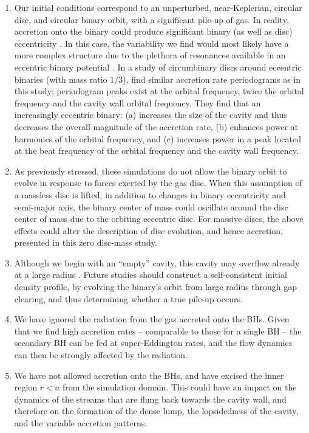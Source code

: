 \begin{enumerate}
\item Our initial conditions correspond to an unperturbed,
  near-Keplerian, circular disc, and circular binary orbit, with a
  significant pile-up of gas.  In reality, accretion onto the binary
  could produce significant binary (as well as disc) eccentricity
  \citep[\textit{e.g.}][]{Cuadra:2009, Lodato:2009, RoedigDotti:2011}.
  In this case, the variability we find would most likely have a more
  complex structure \citep[\textit{e.g.}][]{Hayasaki:2007} due to the
  plethora of resonances available in an eccentric binary potential
  \citep[\textit{e.g.}][]{Artymowicz:1994}. 
In a study of circumbinary discs around eccentric binaries (with mass ratio $1/3$), \citealt{RoedigDotti:2011} find similar accretion rate periodograms as in this study; periodogram peaks exist at the orbital frequency, twice the orbital frequency and the cavity wall orbital frequency. They find that an increasingly eccentric binary: (a) increases the size of the cavity and thus decreases the overall magnitude of the accretion rate, (b) enhances power at harmonics of the orbital frequency, and (c) increases power in a peak located at the beat frequency of the orbital frequency and the cavity wall frequency.
\item As previously stressed, these simulations do not allow the binary orbit to evolve in response to forces exerted by the gas disc. When this assumption of a massless disc is lifted, in addition to changes in binary eccentricity and semi-major axis, the binary center of mass could oscillate around the disc center of mass due to the orbiting eccentric disc. For massive discs, the above effects could alter the description of disc evolution, and hence accretion, presented in this zero disc-mass study.
%
\item Although we begin with an ``empty'' cavity, this cavity may 
  overflow already at a large radius \citep{Kocsis+2012b}.
  Future studies should construct a self-consistent initial density
  profile, by evolving the binary's orbit from large radius through
  gap clearing, and thus determining whether a true pile-up occurs.
\item We have ignored the radiation from the gas accreted onto the
  BHs.  Given that we find high accretion rates -- comparable to those
  for a single BH -- the secondary BH can be fed at super-Eddington
  rates, and the flow dynamics can then be strongly affected by the
  radiation.
\item We have not allowed accretion onto the BHs, and have excised the
  inner region $r<a$ from the simulation domain.  This could have an
  impact on the dynamics of the streams that are flung back towards
  the cavity wall, and therefore on the formation of the dense lump,
  the lopsidedness of the cavity, and the variable accretion patterns.
\end{enumerate}

